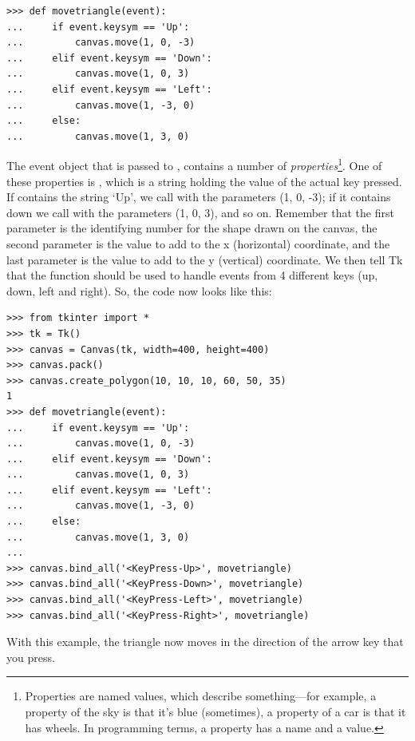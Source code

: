 \begin{listing}
\begin{verbatim}
>>> def movetriangle(event):
...     if event.keysym == 'Up':
...         canvas.move(1, 0, -3)
...     elif event.keysym == 'Down':
...         canvas.move(1, 0, 3)
...     elif event.keysym == 'Left':
...         canvas.move(1, -3, 0)
...     else:
...         canvas.move(1, 3, 0)
\end{verbatim}
\end{listing}

The event object that is passed to , contains a number of \emph{properties}\footnote{Properties are named values, which describe something---for example, a property of the sky is that it's blue (sometimes), a property of a car is that it has wheels. In programming terms, a property has a name and a value.}.  One of these properties is , which is a string holding the value of the actual key pressed.  If  contains the string `Up', we call  with the parameters (1, 0, -3); if it contains down we call with the parameters (1, 0, 3), and so on.  Remember that the first parameter is the identifying number for the shape drawn on the canvas, the second parameter is the value to add to the x (horizontal) coordinate, and the last parameter is the value to add to the y (vertical) coordinate. We then tell Tk that the  function should be used to handle events from 4 different keys (up, down, left and right).  So, the code now looks like this:

\begin{listingignore}
\begin{verbatim}
>>> from tkinter import *
>>> tk = Tk()
>>> canvas = Canvas(tk, width=400, height=400)
>>> canvas.pack()
>>> canvas.create_polygon(10, 10, 10, 60, 50, 35)
1 
>>> def movetriangle(event):
...     if event.keysym == 'Up':
...         canvas.move(1, 0, -3)
...     elif event.keysym == 'Down':
...         canvas.move(1, 0, 3)
...     elif event.keysym == 'Left':
...         canvas.move(1, -3, 0)
...     else:
...         canvas.move(1, 3, 0)
... 
>>> canvas.bind_all('<KeyPress-Up>', movetriangle)
>>> canvas.bind_all('<KeyPress-Down>', movetriangle)
>>> canvas.bind_all('<KeyPress-Left>', movetriangle)
>>> canvas.bind_all('<KeyPress-Right>', movetriangle)
\end{verbatim}
\end{listingignore}

\noindent
With this example, the triangle now moves in the direction of the arrow key that you press.

\newpage
